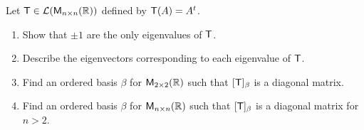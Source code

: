 \begin{ex}\label{ex:5.1.17}
	Let \(\T \in \ls(\ms[n][n][\R])\) defined by \(\mathsf{T}(A) = {A}^{t}\).
	\begin{enumerate}
		\item Show that \(\pm 1\) are the only eigenvalues of \(\mathsf{T}\).
		\item Describe the eigenvectors corresponding to each eigenvalue of \(\mathsf{T}\).
		\item Find an ordered basis \(\beta\) for \(\ms[2][2][\R]\) such that \([\mathsf{T}]_{\beta}\) is a diagonal matrix.
		\item Find an ordered basis \(\beta\) for \(\ms[n][n][\R]\) such that \([\mathsf{T}]_{\beta}\) is a diagonal matrix for \(n > 2\).
	\end{enumerate}
\end{ex}

